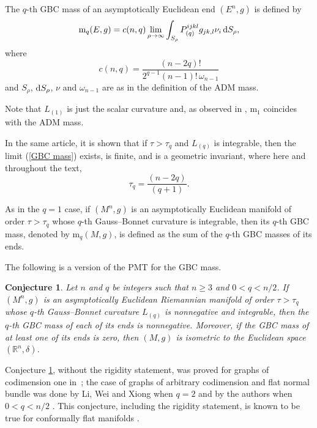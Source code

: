 \documentclass[pdftex]{sigma}
\numberwithin{equation}{section}
\newtheorem{Conjecture}[Theorem]{Conjecture}
 { \theoremstyle{definition}
\newtheorem{Definition}[Theorem]{Definition}
\newtheorem{Note}[Theorem]{Note}
\newtheorem{Example}[Theorem]{Example}
\newtheorem{Remark}[Theorem]{Remark}
\newtheorem{Question}[Theorem]{Question}}
\begin{document}
\begin{Definition}
 The $q$-th GBC mass of an asymptotically Euclidean end $(E^n,g)$ is defined by
 \begin{equation} \label{GBC mass}
  \mathrm{m}_q(E,g) = c(n,q) \lim_{\rho \to \infty} \int_{S_\rho} P_{(q)}^{ijkl}g_{jk,l}\nu_i \,{\rm d}S_\rho,
 \end{equation}
 where
 \begin{equation*} %
  c(n,q) = \frac{(n-2q)!}{2^{q-1}(n-1)! \, \omega_{n-1}}
 \end{equation*}
 and $S_\rho$, ${\rm d}S_\rho$, $\nu$ and $\omega_{n-1}$ are as in the definition of the ADM mass.
\end{Definition}

Note that $L_{(1)}$ is just the scalar curvature and, as observed in \cite{GeAnewmassforasymptoticallyflatmanifolds2014}, $\mathrm{m}_1$ coincides with the ADM mass.

In the same article, it is shown that if $\tau > \tau_q$ and $L_{(q)}$ is integrable, then the limit (\ref{GBC mass}) exists, is finite, and is a geometric invariant, where here and throughout the text,
\begin{equation*} %
\tau_q = \frac{(n-2q)}{(q+1)}.
\end{equation*}

As in the $q=1$ case, if $(M^n,g)$ is an asymptotically Euclidean manifold of order $\tau > \tau_q$ whose $q$-th Gauss--Bonnet curvature is integrable, then its $q$-th GBC mass, denoted by $\mathrm{m}_q(M,g)$, is defined as the sum of the $q$-th GBC masses of its ends.

The following is a version of the PMT for the GBC mass.

\begin{Conjecture} \label{PMT for m_q}
Let $n$ and $q$ be integers such that $n \geq 3$ and $0 < q < n/2$. If $(M^n,g)$ is an asymptotically Euclidean Riemannian manifold of order $\tau > \tau_q$ whose $q$-th Gauss--Bonnet curvature $L_{(q)}$ is nonnegative and integrable, then the $q$-th GBC mass of each of its ends is nonnegative. Moreover, if the GBC mass of at least one of its ends is zero, then $(M,g)$ is isometric to the Euclidean space $(\mathbb{R}^n,\delta)$.
\end{Conjecture}

Conjecture \ref{PMT for m_q}, without the rigidity statement, was proved for graphs of codimension one in~\cite{GeAnewmassforasymptoticallyflatmanifolds2014}; the case of graphs of arbitrary codimension and flat normal bundle was done by Li, Wei and Xiong when $q=2$ \cite{LiGaussBonnetChernmassgraphic2014} and by the authors when $0 < q < n/2$ \cite{AlexandredeSousaUmBreveEstudos2016,AlexandredeSousaGaussBonnetChernmasshigher2019}. This conjecture, including the rigidity statement, is known to be true for conformally flat manifolds \cite{GeGaussBonnetChernmassconformally2014}.
\end{document}
